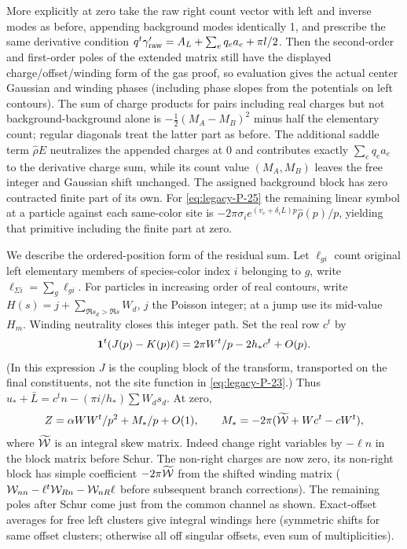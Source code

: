 More explicitly at zero take the raw right count vector with left and inverse modes as before, appending background modes identically 1, and prescribe the same derivative condition \(q^t\gamma'_{\rm raw}=A_L+\sum_e q_e a_e+\pi l/2\). Then the second-order and first-order poles of the extended matrix still have the displayed charge/offset/winding form of the gas proof, so evaluation gives the actual center Gaussian and winding phases (including phase slopes from the potentials on left contours). The sum of charge products for pairs including real charges but not background-background alone is \(-\tfrac12(M_A-M_B)^2\) minus half the elementary count; regular diagonals treat the latter part as before. The additional saddle term \(\widehat\rho E\) neutralizes the appended charges at 0 and contributes exactly \(\sum_e q_e a_e\) to the derivative charge sum, while its count value \((M_A,M_B)\) leaves the free integer and Gaussian shift unchanged. The assigned background block has zero contracted finite part of its own. For \eqref{eq:legacy-P-25} the remaining linear symbol at a particle against each same-color site is \(-2\pi\sigma_i e^{(v_e+\delta_i L)p}\widehat\rho(p)/p\), yielding that primitive including the finite part at zero.



We describe the ordered-position form of the residual sum. Let \(\ell_{gi}\) count original left elementary members of species-color index \(i\) belonging to \(g\), write \(\ell_{\Sigma i}=\sum_g\ell_{gi}\). For particles in increasing order of real contours, write \(H(s)=j+\sum_{\Re s_d>\Re s} W_d\), \(j\) the Poisson integer; at a jump use its mid-value \(H_m\). Winding neutrality closes this integer path. Set the real row \(c^t\) by
\[
 {\bf1}^t(J(p)-K(p)\ell)=2\pi W^t/p-2h_* c^t+O(p).
\]
(In this expression \(J\) is the coupling block of the transform, transported on the final constituents, not the site function in \eqref{eq:legacy-P-23}.) Thus \(u_*+\bar L=c^t n-(\pi i/h_*)\sum W_d s_d\). At zero,
\begin{equation}
 Z=\alpha WW^t/p^2+M_*/p+O(1),\qquad
 M_*=-2\pi(\widetilde{\cal W}+W c^t-c W^t),
 \label{eq:legacy-P-26}
\end{equation}
where \(\widetilde{\cal W}\) is an integral skew matrix. Indeed change right variables by \(-\ell n\) in the block matrix before Schur. The non-right charges are now zero, its non-right block has simple coefficient \(-2\pi\widetilde{\cal W}\) from the shifted winding matrix (\({\cal W}_{nn}-\ell^t{\cal W}_{Rn}-{\cal W}_{nR}\ell\) before subsequent branch corrections). The remaining poles after Schur come just from the common channel as shown. Exact-offset averages for free left clusters give integral windings here (symmetric shifts for same offset clusters; otherwise all off singular offsets, even sum of multiplicities).



